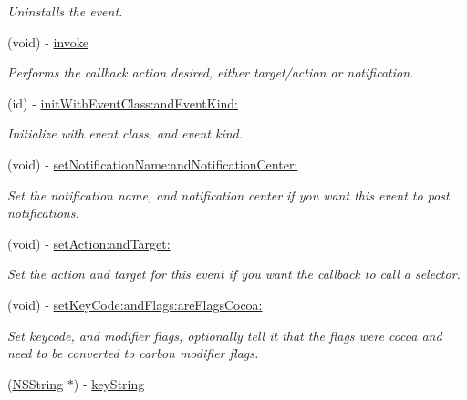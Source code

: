 \begin{DoxyCompactItemize}
\begin{DoxyCompactList}\small\item\em Uninstalls the event. \item\end{DoxyCompactList}\item 
(void) -\/ \hyperlink{interface_g_d_carbon_event_a4639c12245fe48e533ec792b3f89d90e}{invoke}
\begin{DoxyCompactList}\small\item\em Performs the callback action desired, either target/action or notification. \item\end{DoxyCompactList}\item 
(id) -\/ \hyperlink{interface_g_d_carbon_event_a8826878465bd97dd2aab07a7cef13b40}{initWithEventClass:andEventKind:}
\begin{DoxyCompactList}\small\item\em Initialize with event class, and event kind. \item\end{DoxyCompactList}\item 
(void) -\/ \hyperlink{interface_g_d_carbon_event_a33e3feb0ec56180d02e170e8bf213b6c}{setNotificationName:andNotificationCenter:}
\begin{DoxyCompactList}\small\item\em Set the notification name, and notification center if you want this event to post notifications. \item\end{DoxyCompactList}\item 
(void) -\/ \hyperlink{interface_g_d_carbon_event_af2ae15b5b721c80a99c6fd84fc5fc23e}{setAction:andTarget:}
\begin{DoxyCompactList}\small\item\em Set the action and target for this event if you want the callback to call a selector. \item\end{DoxyCompactList}\item 
(void) -\/ \hyperlink{interface_g_d_carbon_event_a0140fa16d6e2987aa2437f6e56a8269d}{setKeyCode:andFlags:areFlagsCocoa:}
\begin{DoxyCompactList}\small\item\em Set keycode, and modifier flags, optionally tell it that the flags were cocoa and need to be converted to carbon modifier flags. \item\end{DoxyCompactList}\item 
\hypertarget{interface_g_d_carbon_event_a140777cec8832d843cf2147ca31d552d}{
(\hyperlink{class_n_s_string}{NSString} $\ast$) -\/ \hyperlink{interface_g_d_carbon_event_a140777cec8832d843cf2147ca31d552d}{keyString}}
\label{interface_g_d_carbon_event_a140777cec8832d843cf2147ca31d552d}


\end{DoxyCompactItemize}

